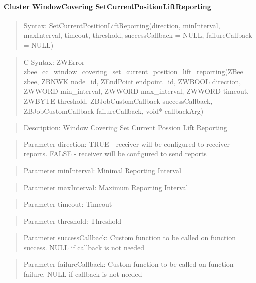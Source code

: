 \paragraph{Cluster WindowCovering SetCurrentPositionLiftReporting}
\begin{quote}Syntax: SetCurrentPositionLiftReporting(direction, minInterval, maxInterval, timeout, threshold, successCallback = NULL, failureCallback = NULL)\end{quote}
\begin{quote}C Syntax: ZWError zbee\_cc\_window\_covering\_set\_current\_position\_lift\_reporting(ZBee zbee, ZBNWK node\_id, ZEndPoint endpoint\_id, ZWBOOL direction, ZWWORD min\_interval, ZWWORD max\_interval, ZWWORD timeout, ZWBYTE threshold, ZBJobCustomCallback successCallback, ZBJobCustomCallback failureCallback, void* callbackArg)\end{quote}
\begin{quote}Description: Window Covering Set Current Possion Lift Reporting\end{quote}
\begin{quote}Parameter direction: TRUE  - receiver will be configured to receiver reports. FALSE - receiver will be configured to send reports\end{quote}
\begin{quote}Parameter minInterval: Minimal Reporting Interval\end{quote}
\begin{quote}Parameter maxInterval: Maximum Reporting Interval\end{quote}
\begin{quote}Parameter timeout: Timeout\end{quote}
\begin{quote}Parameter threshold: Threshold\end{quote}
\begin{quote}Parameter successCallback: Custom function to be called on function success. NULL if callback is not needed\end{quote}
\begin{quote}Parameter failureCallback: Custom function to be called on function failure. NULL if callback is not needed\end{quote}


